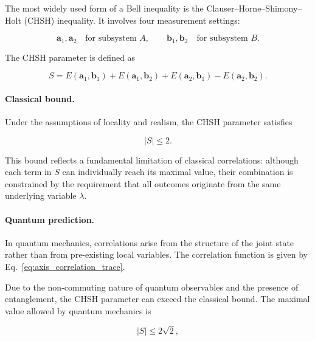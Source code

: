 \medskip

The most widely used form of a Bell inequality is the Clauser--Horne--Shimony--Holt (CHSH) inequality. It involves four measurement settings:

\[
\mathbf{a}_1,\mathbf{a}_2
\quad
\text{for subsystem } A,
\qquad
\mathbf{b}_1,\mathbf{b}_2
\quad
\text{for subsystem } B.
\]

The CHSH parameter is defined as

\begin{equation}
S
=
E(\mathbf{a}_1,\mathbf{b}_1)
+
E(\mathbf{a}_1,\mathbf{b}_2)
+
E(\mathbf{a}_2,\mathbf{b}_1)
-
E(\mathbf{a}_2,\mathbf{b}_2).
\label{eq:chsh_parameter}
\end{equation}

\medskip

\paragraph{Classical bound.}

Under the assumptions of locality and realism, the CHSH parameter satisfies

\begin{equation}
|S| \le 2.
\label{eq:chsh_classical_bound}
\end{equation}

This bound reflects a fundamental limitation of classical correlations: although each term in \( S \) can individually reach its maximal value, their combination is constrained by the requirement that all outcomes originate from the same underlying variable \( \lambda \).

\medskip

\paragraph{Quantum prediction.}

In quantum mechanics, correlations arise from the structure of the joint state rather than from pre-existing local variables. The correlation function is given by Eq.~\eqref{eq:axis_correlation_trace}.

Due to the non-commuting nature of quantum observables and the presence of entanglement, the CHSH parameter can exceed the classical bound. The maximal value allowed by quantum mechanics is

\begin{equation}
|S| \le 2\sqrt{2},
\label{eq:tsirelson_bound}
\end{equation}

